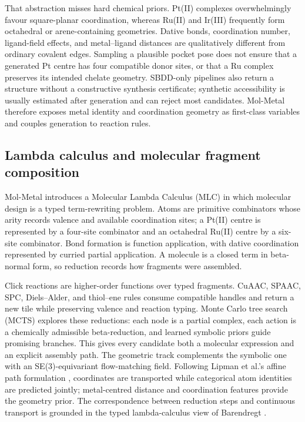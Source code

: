 \documentclass[10pt]{article}
\begin{document}
That abstraction misses hard chemical priors. Pt(II) complexes overwhelmingly favour square-planar coordination, whereas Ru(II) and Ir(III) frequently form octahedral or arene-containing geometries. Dative bonds, coordination number, ligand-field effects, and metal--ligand distances are qualitatively different from ordinary covalent edges.
Sampling a plausible pocket pose does not ensure that a generated Pt centre has four compatible donor sites, or that a Ru complex preserves its intended chelate geometry. SBDD-only pipelines also return a structure without a constructive synthesis certificate; synthetic accessibility is usually estimated after generation and can reject most candidates. Mol-Metal therefore exposes metal identity and coordination geometry as first-class variables and couples generation to reaction rules.

\subsection{Lambda calculus and molecular fragment composition}

Mol-Metal introduces a Molecular Lambda Calculus (MLC) in which molecular design is a typed term-rewriting problem. Atoms are primitive combinators whose arity records valence and available coordination sites; a Pt(II) centre is represented by a four-site combinator and an octahedral Ru(II) centre by a six-site combinator. Bond formation is function application, with dative coordination represented by curried partial application. A molecule is a closed term in beta-normal form, so reduction records how fragments were assembled.

Click reactions are higher-order functions over typed fragments. CuAAC, SPAAC, SPC, Diels--Alder, and thiol--ene rules consume compatible handles and return a new tile while preserving valence and reaction typing. Monte Carlo tree search (MCTS) explores these reductions: each node is a partial complex, each action is a chemically admissible beta-reduction, and learned symbolic priors guide promising branches. This gives every candidate both a molecular expression and an explicit assembly path. The geometric track complements the symbolic one with an SE(3)-equivariant flow-matching field. Following Lipman et al.'s affine path formulation \cite{lipman2023flow}, coordinates are transported while categorical atom identities are predicted jointly; metal-centred distance and coordination features provide the geometry prior. The correspondence between reduction steps and continuous transport is grounded in the typed lambda-calculus view of Barendregt \cite{barendregt1984lambda}.
\end{document}

